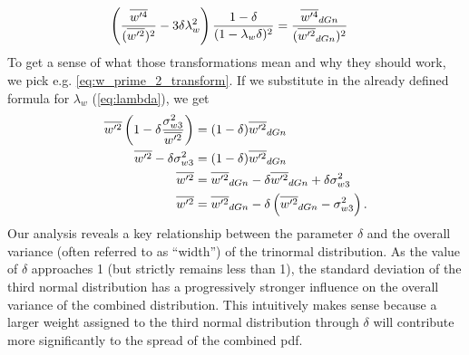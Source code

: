 \begin{align}
    \label{eq:w_prime_4_div_w_prime_2_transform}
    \left(\frac{\overline{w'^4}}{(\overline{w'^2})^2} - 3\delta\lambda_w^2 \right) \frac{1 - \delta}{(1 - \lambda_w\delta)^2}
    &= \frac{\overline{w'^4}_{dGn}}{(\overline{w'^2}_{dGn})^2}
\end{align}
To get a sense of what those transformations mean and why they should work,
we pick e.g. \cref{eq:w_prime_2_transform}.
If we substitute in the already defined formula for $\lambda_w$ (\cref{eq:lambda}), we get
\begin{align}
    \overline{w'^2} \left(1 - \delta\frac{\sigma_{w 3}^2}{\overline{w'^2}}\right)
    &= (1 - \delta)\overline{w'^2}_{dGn} \nonumber\\
    \overline{w'^2} - \delta\sigma_{w 3}^2
    &= (1 - \delta)\overline{w'^2}_{dGn} \nonumber\\
    \overline{w'^2}
    &= \overline{w'^2}_{dGn} - \delta\overline{w'^2}_{dGn} + \delta\sigma_{w 3}^2 \nonumber\\
    \overline{w'^2}
    &= \overline{w'^2}_{dGn} - \delta\left(\overline{w'^2}_{dGn} - \sigma_{w 3}^2\right).
\end{align}
Our analysis reveals a key relationship between the parameter $\delta$
and the overall variance (often referred to as \enquote{width}) of the trinormal distribution.
As the value of $\delta$ approaches 1 (but strictly remains less than 1),
the standard deviation of the third normal distribution
has a progressively stronger influence on the overall variance of the combined distribution.
This intuitively makes sense because a larger weight assigned to the third normal distribution through $\delta$
will contribute more significantly to the spread of the combined \gls{pdf}.


